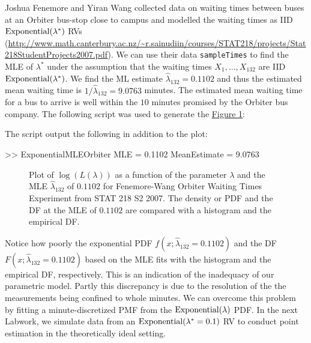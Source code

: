 {\begin{labwork}\label{LW:ExponentialMLEOrbiter}
Joshua Fenemore and Yiran Wang collected data on waiting times between buses at an Orbiter bus-stop close to campus and modelled the waiting times as IID $\mbox{{\rm Exponential}}(\lambda^*)$ RVs (\href{http://www.math.canterbury.ac.nz/~r.sainudiin/courses/STAT218/projects/Stat218StudentProjects2007.pdf}{\url{http://www.math.canterbury.ac.nz/~r.sainudiin/courses/STAT218/projects/Stat218StudentProjects2007.pdf}}).  We can use their data {\tt sampleTimes} to find the MLE of $\lambda^*$ under the assumption that the waiting times $X_1,\ldots,X_{132}$ are IID $\mbox{{\rm Exponential}}(\lambda^*)$.  We find the ML estimate $\widehat{\lambda}_{132}=0.1102$ and thus the estimated mean waiting time is $1/\widehat{\lambda}_{132}=9.0763$ minutes.  The estimated mean waiting time for a bus to arrive is well within the $10$ minutes promised by the Orbiter bus company.  The following script was used to generate the \hyperref[F:ExponentialMLE]{Figure \ref*{F:ExponentialMLEOrbiter}}:


The script output the following in addition to the plot:
\begin{VrbM}
>> ExponentialMLEOrbiter
MLE =    0.1102
MeanEstimate =    9.0763
\end{VrbM}
\end{labwork}

\begin{figure}[htpb]
\caption{Plot of $\log(L(\lambda))$ as a function of the parameter $\lambda$  and the MLE $\widehat{\lambda}_{132}$ of $0.1102$ for Fenemore-Wang Orbiter Waiting Times Experiment from STAT 218 S2 2007.  The density or PDF and the DF at the MLE of $0.1102$ are compared with a histogram and the empirical DF.\label{F:ExponentialMLEOrbiter}}
\centering   {}
\end{figure}
Notice how poorly the exponential PDF $f(x;\widehat{\lambda}_{132}=0.1102)$ and the DF $F(x;\widehat{\lambda}_{132}=0.1102)$ based on the MLE fits with the histogram and the empirical DF, respectively.  This is an indication of the inadequacy of our parametric model.  Partly this discrepancy is due to the resolution of the the measurements being confined to whole minutes.  We can overcome this problem by fitting a minute-discretized PMF from the $\mbox{{\rm Exponential}}(\lambda)$ PDF.  In the next Labwork, we simulate data from an $\mbox{{\rm Exponential}}(\lambda^*=0.1)$ RV to conduct point estimation in the theoretically ideal setting. 

}
